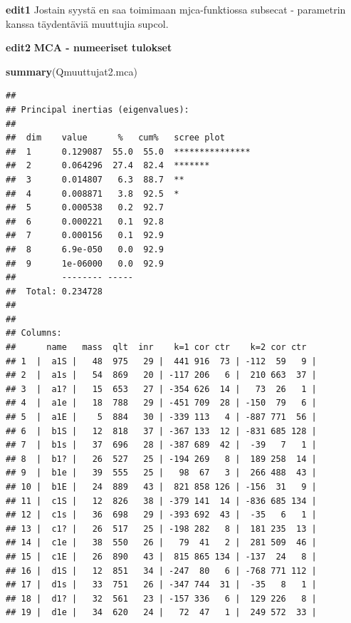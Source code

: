 \documentclass[
  finnish,
]{book}
\newenvironment{Shaded}{\begin{snugshade}}{\end{snugshade}}
\newcommand{\KeywordTok}[1]{\textcolor[rgb]{0.13,0.29,0.53}{\textbf{#1}}}
\newcommand{\NormalTok}[1]{#1}
\begin{document}
\textbf{edit1} Jostain syystä en saa toimimaan mjca-funktiossa subsecat
- parametrin kanssa täydentäviä muuttujia supcol.

\textbf{edit2} \textbf{MCA - numeeriset tulokset}

\begin{Shaded}
\begin{Highlighting}[]
\KeywordTok{summary}\NormalTok{(Qmuuttujat2.mca)}
\end{Highlighting}
\end{Shaded}

\begin{verbatim}
## 
## Principal inertias (eigenvalues):
## 
##  dim    value      %   cum%   scree plot               
##  1      0.129087  55.0  55.0  ***************          
##  2      0.064296  27.4  82.4  *******                  
##  3      0.014807   6.3  88.7  **                       
##  4      0.008871   3.8  92.5  *                        
##  5      0.000538   0.2  92.7                           
##  6      0.000221   0.1  92.8                           
##  7      0.000156   0.1  92.9                           
##  8      6.9e-050   0.0  92.9                           
##  9      1e-06000   0.0  92.9                           
##         -------- -----                                 
##  Total: 0.234728                                       
## 
## 
## Columns:
##      name   mass  qlt  inr    k=1 cor ctr    k=2 cor ctr  
## 1  |  a1S |   48  975   29 |  441 916  73 | -112  59   9 |
## 2  |  a1s |   54  869   20 | -117 206   6 |  210 663  37 |
## 3  |  a1? |   15  653   27 | -354 626  14 |   73  26   1 |
## 4  |  a1e |   18  788   29 | -451 709  28 | -150  79   6 |
## 5  |  a1E |    5  884   30 | -339 113   4 | -887 771  56 |
## 6  |  b1S |   12  818   37 | -367 133  12 | -831 685 128 |
## 7  |  b1s |   37  696   28 | -387 689  42 |  -39   7   1 |
## 8  |  b1? |   26  527   25 | -194 269   8 |  189 258  14 |
## 9  |  b1e |   39  555   25 |   98  67   3 |  266 488  43 |
## 10 |  b1E |   24  889   43 |  821 858 126 | -156  31   9 |
## 11 |  c1S |   12  826   38 | -379 141  14 | -836 685 134 |
## 12 |  c1s |   36  698   29 | -393 692  43 |  -35   6   1 |
## 13 |  c1? |   26  517   25 | -198 282   8 |  181 235  13 |
## 14 |  c1e |   38  550   26 |   79  41   2 |  281 509  46 |
## 15 |  c1E |   26  890   43 |  815 865 134 | -137  24   8 |
## 16 |  d1S |   12  851   34 | -247  80   6 | -768 771 112 |
## 17 |  d1s |   33  751   26 | -347 744  31 |  -35   8   1 |
## 18 |  d1? |   32  561   23 | -157 336   6 |  129 226   8 |
## 19 |  d1e |   34  620   24 |   72  47   1 |  249 572  33 |

\end{verbatim}
\end{document}
